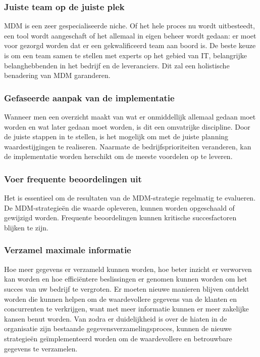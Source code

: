 \subsubsection{Juiste team op de juiste plek}
MDM is een zeer gespecialiseerde niche. Of het hele proces nu wordt uitbesteedt, een tool wordt aangeschaft of het allemaal in eigen beheer wordt gedaan: er moet voor gezorgd worden dat er een gekwalificeerd team aan boord is. De beste keuze is om een team samen te stellen met experts op het gebied van IT, belangrijke belanghebbenden in het bedrijf en de leveranciers. Dit zal een holistische benadering van MDM garanderen.

\subsubsection{Gefaseerde aanpak van de implementatie}
Wanneer men een overzicht maakt van wat er onmiddellijk allemaal gedaan moet worden en wat later gedaan moet worden, is dit een omvatrijke discipline. Door de juiste stappen in te stellen, is het mogelijk om met de juiste planning waardestijgingen te realiseren. Naarmate de bedrijfsprioriteiten veranderen, kan de implementatie worden herschikt om de meeste voordelen op te leveren.

\subsubsection{Voer frequente beoordelingen uit}
Het is essentieel om de resultaten van de MDM-strategie regelmatig te evalueren. De MDM-strategieën die waarde opleveren, kunnen worden opgeschaald of gewijzigd worden. Frequente beoordelingen kunnen kritische succesfactoren blijken te zijn.

\subsubsection{Verzamel maximale informatie}
Hoe meer gegevens er verzameld kunnen worden, hoe beter inzicht er verworven kan worden en hoe efficiëntere beslissingen er genomen kunnen worden om het succes van uw bedrijf te vergroten. Er moeten nieuwe manieren blijven ontdekt worden die kunnen helpen om de waardevollere gegevens van de klanten en concurrenten te verkrijgen, want met meer informatie kunnen er meer zakelijke kansen benut worden. Van zodra er duidelijkheid is over de hiaten in de organisatie zijn bestaande gegevensverzamelingsproces, kunnen de nieuwe strategieën geïmplementeerd worden om de waardevollere en betrouwbare gegevens te verzamelen.

